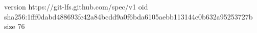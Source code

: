version https://git-lfs.github.com/spec/v1
oid sha256:1fff0dabd488693fc42a84bcdd9a0f6bda6105aebb113144c0b632a95253727b
size 76
